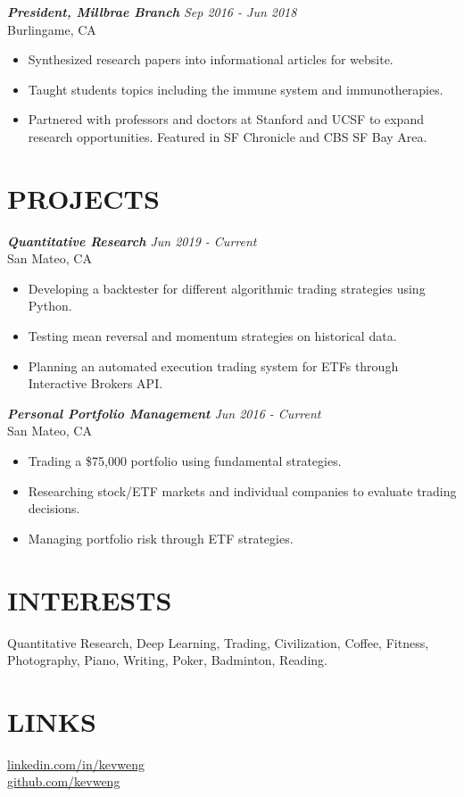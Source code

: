 \documentclass[margin, 10pt]{res} %
\begin{document}
\begin{resume}
{\sl {\bf President, Millbrae Branch} \hfill Sep 2016 - Jun 2018} \\
Burlingame, CA
\begin{itemize}  \itemsep -1pt
\item Synthesized research papers into informational articles for website. 
\item Taught students topics including the immune system and immunotherapies.
\item Partnered with professors and doctors at Stanford and UCSF to expand research opportunities. Featured in SF Chronicle and CBS SF Bay Area.
\end{itemize} 




\section{\large PROJECTS} 

{\sl {\bf Quantitative Research} \hfill Jun 2019 - Current} \\
San Mateo, CA
\begin{itemize}  \itemsep -1pt
\item Developing a backtester for different algorithmic trading strategies using Python.
\item Testing mean reversal and momentum strategies on historical data.
\item Planning an automated execution trading system for ETFs through Interactive Brokers API. 
\end{itemize} 

{\sl {\bf Personal Portfolio Management} \hfill Jun 2016 - Current} \\
San Mateo, CA
\begin{itemize}  \itemsep -1pt
\item Trading a \$75,000 portfolio using fundamental strategies.
\item Researching stock/ETF markets and individual companies to evaluate trading decisions.
\item Managing portfolio risk through ETF strategies.
\end{itemize} 
\section{\large INTERESTS}
Quantitative Research, Deep Learning, Trading, Civilization, Coffee, Fitness, Photography, Piano, Writing, Poker, Badminton, Reading.

\section{\large LINKS}

\href{https://www.linkedin.com/in/kevweng/}{linkedin.com/in/kevweng}\\
\href{https://github.com/kevweng}{github.com/kevweng}

\end{resume}
\end{document}
